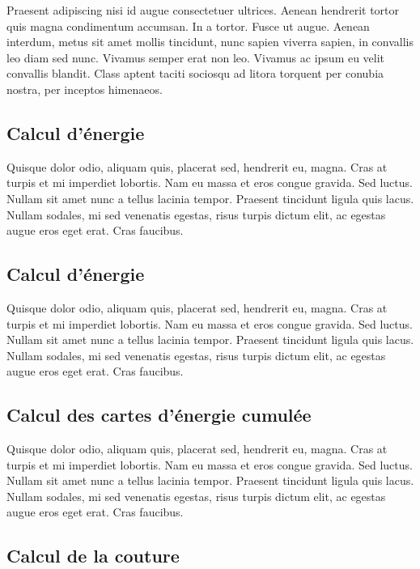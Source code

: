 \documentclass[a4paper]{article}
\begin{document}
Praesent adipiscing nisi id augue consectetuer ultrices. Aenean hendrerit tortor
quis magna condimentum accumsan. In a tortor. Fusce ut augue. Aenean interdum,
metus sit amet mollis tincidunt, nunc sapien viverra sapien, in convallis leo
diam sed nunc. Vivamus semper erat non leo. Vivamus ac ipsum eu velit convallis
blandit. Class aptent taciti sociosqu ad litora torquent per conubia nostra, per
inceptos himenaeos.

\subsection{Calcul d'énergie}

Quisque dolor odio, aliquam quis, placerat sed, hendrerit eu, magna. Cras at
turpis et mi imperdiet lobortis. Nam eu massa et eros congue gravida. Sed
luctus. Nullam sit amet nunc a tellus lacinia tempor. Praesent tincidunt ligula
quis lacus. Nullam sodales, mi sed venenatis egestas, risus turpis dictum elit,
ac egestas augue eros eget erat. Cras faucibus.

\subsection{Calcul d'énergie}

Quisque dolor odio, aliquam quis, placerat sed, hendrerit eu, magna. Cras at
turpis et mi imperdiet lobortis. Nam eu massa et eros congue gravida. Sed
luctus. Nullam sit amet nunc a tellus lacinia tempor. Praesent tincidunt ligula
quis lacus. Nullam sodales, mi sed venenatis egestas, risus turpis dictum elit,
ac egestas augue eros eget erat. Cras faucibus.

\subsection{Calcul des cartes d'énergie cumulée}

Quisque dolor odio, aliquam quis, placerat sed, hendrerit eu, magna. Cras at
turpis et mi imperdiet lobortis. Nam eu massa et eros congue gravida. Sed
luctus. Nullam sit amet nunc a tellus lacinia tempor. Praesent tincidunt ligula
quis lacus. Nullam sodales, mi sed venenatis egestas, risus turpis dictum elit,
ac egestas augue eros eget erat. Cras faucibus.

\subsection{Calcul de la couture}
\end{document}
